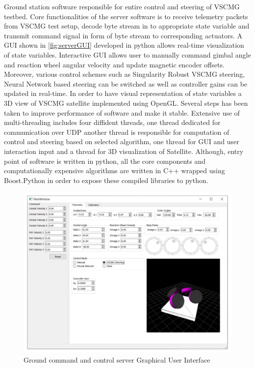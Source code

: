 \newpage
Ground station software responsible for entire control and steering of VSCMG testbed. Core functionalities of the server software is to receive telemetry packets from VSCMG test setup, decode byte stream in to appropriate state variable and transmit command signal in form of byte stream to corresponding actuators. A GUI shown in \autoref{fig:serverGUI} developed in python allows real-time visualization of state variables. Interactive GUI allows user to manually command gimbal angle and reaction wheel angular velocity and update magnetic encoder offsets. Moreover, various control schemes such as Singularity Robust VSCMG steering, Neural Network based steering  can be switched  as well as controller gains can be updated in real-time. In order to have visual representation of state variables a 3D view of VSCMG satellite implemented using OpenGL. Several steps has been taken to improve performance of software and make it stable. Extensive use of multi-threading includes four diffident threads, one thread dedicated for communication over UDP another thread is responsible for computation of control and steering based on selected algorithm, one thread for GUI and user interaction input and a thread for 3D visualization of Satellite. Although, entry point of software is written in python, all the core components and computationally expensive algorithms are written in C++ wrapped using Boost.Python \cite{abrahams2003building} in order to expose these compiled libraries to python.

\begin{figure}[ht]
    \centering
    \includegraphics[width=1.0\textwidth]{figures/Electronics/Server.pdf}
    \caption{Ground command and control server Graphical User Interface}
    \label{fig:serverGUI}
\end{figure}
